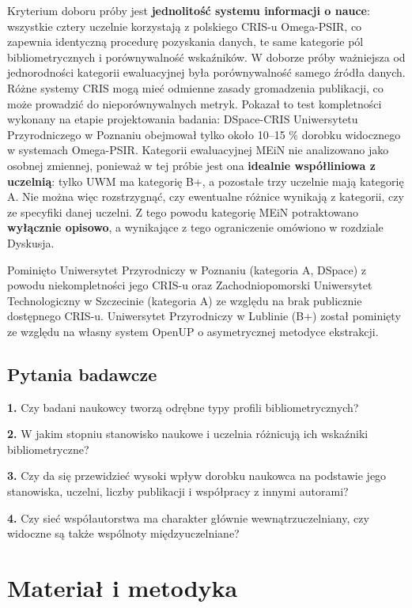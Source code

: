 \documentclass[
  polish,
  12pt,
  a4paper,
]{article}
\begin{document}
Kryterium doboru próby jest \textbf{jednolitość systemu informacji o
nauce}: wszystkie cztery uczelnie korzystają z polskiego CRIS-u
Omega-PSIR, co zapewnia identyczną procedurę pozyskania danych, te same
kategorie pól bibliometrycznych i porównywalność wskaźników. W doborze
próby ważniejsza od jednorodności kategorii ewaluacyjnej była
porównywalność samego źródła danych. Różne systemy CRIS mogą mieć
odmienne zasady gromadzenia publikacji, co może prowadzić do
nieporównywalnych metryk. Pokazał to test kompletności wykonany na
etapie projektowania badania: DSpace-CRIS Uniwersytetu Przyrodniczego w
Poznaniu obejmował tylko około 10--15 \% dorobku widocznego w systemach
Omega-PSIR. Kategorii ewaluacyjnej MEiN nie analizowano jako osobnej
zmiennej, ponieważ w tej próbie jest ona \textbf{idealnie współliniowa z
uczelnią}: tylko UWM ma kategorię B+, a pozostałe trzy uczelnie mają
kategorię A. Nie można więc rozstrzygnąć, czy ewentualne różnice
wynikają z kategorii, czy ze specyfiki danej uczelni. Z tego powodu
kategorię MEiN potraktowano \textbf{wyłącznie opisowo}, a wynikające z
tego ograniczenie omówiono w rozdziale Dyskusja.

Pominięto Uniwersytet Przyrodniczy w Poznaniu (kategoria A, DSpace) z
powodu niekompletności jego CRIS-u oraz Zachodniopomorski Uniwersytet
Technologiczny w Szczecinie (kategoria A) ze względu na brak publicznie
dostępnego CRIS-u. Uniwersytet Przyrodniczy w Lublinie (B+) został
pominięty ze względu na własny system OpenUP o asymetrycznej metodyce
ekstrakcji.

\newpage{}

\subsection{Pytania badawcze}\label{pytania-badawcze}

\textbf{1.} Czy badani naukowcy tworzą odrębne typy profili
bibliometrycznych?

\textbf{2.} W jakim stopniu stanowisko naukowe i uczelnia różnicują ich
wskaźniki bibliometryczne?

\textbf{3.} Czy da się przewidzieć wysoki wpływ dorobku naukowca na
podstawie jego stanowiska, uczelni, liczby publikacji i współpracy z
innymi autorami?

\textbf{4.} Czy sieć współautorstwa ma charakter głównie
wewnątrzuczelniany, czy widoczne są także wspólnoty międzyuczelniane?

\section{Materiał i metodyka}\label{materiaux142-i-metodyka}
\end{document}
